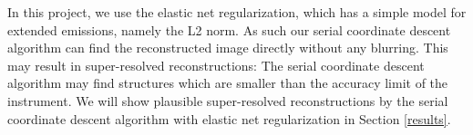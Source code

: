 In this project, we use the elastic net regularization, which has a simple model for extended emissions, namely the L2 norm. As such our serial coordinate descent algorithm can find the reconstructed image directly without any blurring. This may result in super-resolved reconstructions: The serial coordinate descent algorithm may find structures which are smaller than the accuracy limit of the instrument. We will show plausible super-resolved reconstructions by the serial coordinate descent algorithm with elastic net regularization in Section \ref{results}.


